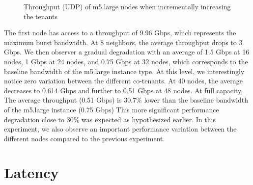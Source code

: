 \begin{figure}[H]
\caption{Throughput (UDP) of m5.large nodes when incrementally increasing the tenants}
\end{figure}
\noindent
The first node has access to a throughput of 9.96 Gbps, which represents the maximum burst bandwidth. 
At 8 neighbors, the average throughput drops to 3 Gbps. We then observer a gradual degradation 
with an average of 1.5 Gbps at 16 nodes, 1 Gbps at 24 nodes, and  0.75 Gbps at 32 nodes,  which corresponds 
to the baseline bandwidth of the m5.large instance type. 
At this level, we interestingly notice zero variation between the 
different co-tenants. At 40 nodes, the average decreases to 0.614 Gbps and further to 0.51 Gbps at 48 nodes.  
At full capacity, The average throughput (0.51 Gbps) is 30.7\% lower than the baseline bandwidth of the 
m5.large instance (0.75 Gbps)
This more significant performance degradation close to 30\% was expected as hypothesized earlier. 
In this experiment, we also observe an important performance variation between the different nodes 
compared to the previous experiment.

\section{Latency}

